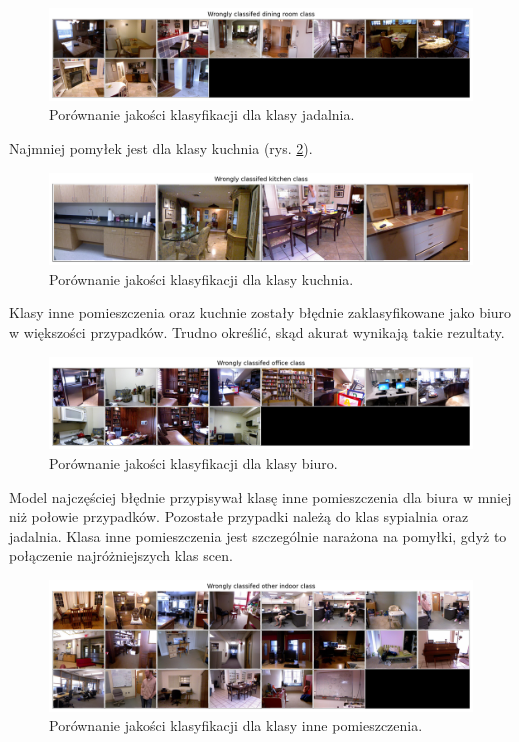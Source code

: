 \begin{figure}[ht!]
    \centering
    \includegraphics[width=\textwidth]{img/preds_analysis/classification/dining_room.png}
    \caption{Porównanie jakości klasyfikacji dla klasy jadalnia.}
    \label{fig:dining_room-false-pred}
\end{figure}
Najmniej pomyłek jest dla klasy kuchnia (rys. \ref{fig:kitchen-false-pred}).
\begin{figure}[ht!]
    \centering
    \includegraphics[width=\textwidth]{img/preds_analysis/classification/kitchen.png}
    \caption{Porównanie jakości klasyfikacji dla klasy kuchnia.}
    \label{fig:kitchen-false-pred}
\end{figure}
Klasy inne pomieszczenia oraz kuchnie zostały błędnie zaklasyfikowane jako biuro w większości przypadków. Trudno określić, skąd akurat wynikają takie rezultaty.

\begin{figure}[ht!]
    \centering
    \includegraphics[width=\textwidth]{img/preds_analysis/classification/office.png}
    \caption{Porównanie jakości klasyfikacji dla klasy biuro.}
    \label{fig:office-false-pred}
\end{figure}
Model najczęściej błędnie przypisywał klasę inne pomieszczenia dla biura w mniej niż połowie przypadków. Pozostałe przypadki należą do klas sypialnia oraz jadalnia. Klasa inne pomieszczenia jest szczególnie narażona na pomyłki, gdyż to połączenie najróżniejszych klas scen.
\begin{figure}[ht!]
    \centering
    \includegraphics[width=\textwidth]{img/preds_analysis/classification/other_indoor.png}
    \caption{Porównanie jakości klasyfikacji dla klasy inne pomieszczenia.}
    \label{fig:oter_indoor-false-pred}
\end{figure}


